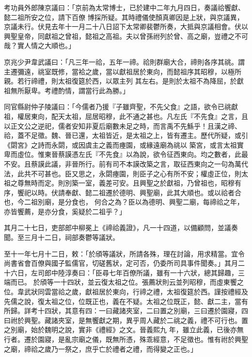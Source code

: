 \begin{pinyinscope}
 考功員外郎陳京議曰：「京前為太常博士，已於建中二年九月四日，奏議祫饗獻、懿二祖所安之位，請下百僚
 博採所疑。其時禮儀使顏真卿因是上狀，與京議異，京議未行。伏見去年十一月二十八日詔下太常卿裴鬱所奏，大抵與京議相會。伏以興聖皇帝，同獻祖之曾祖，懿祖之高祖。夫以曾孫祔列於曾、高之廟，豈禮之不可哉？實人情之大順也。」



 京兆少尹韋武議曰：「凡三年一祫，五年一禘。祫則群廟大合，禘則各序其祧。謂主遷彌遠，祧室既修，當袷之歲，當以獻祖居於東向，而懿祖序其昭穆，以極所親。若行禘禮，則太祖復筵於西，以眾主列
 其左右。是則於太祖不為降屈，於獻祖無所厭卑。考禮酌情，謂當行此為勝。」



 同官縣尉仲子陵議曰：「今儒者乃援『子雖齊聖，不先父食』之語，欲令已祧獻祖，權居東向，配天太祖，屈居昭穆，此不通之甚也。凡左氏『不先食』之言，且以正文公之逆祀，儒者安知非夏后廟數未足之時，而言禹不先鯀乎！且漢之禘、祫，蓋不足徵。魏、晉已還，太祖皆近，是太祖之上，皆有遷主。歷代所疑，或引《閟宮》之詩而永閟，或因虞主之義而瘞園，或緣遠廟為祧以
 築宮，或言太祖實卑而虛位。惟東晉蔡謨憑左氏『不先食』以為說，欲令征西東向。均之數者，此最不安。且蔡謨此議，非晉所行。前有司不本謨改築之言，取征西東向之一句為萬代法，此共不可甚也。臣又思之，永閟瘞園，則臣子之心有所不安；權虛正位，則太祖之尊無時而定。則別築一室，義差可安。且興聖之於獻祖，乃曾祖也，昭穆有序，饗祀以時。伏請奉獻、懿二祖遷於德明、興聖廟，此其大順也。或以祫者合也，今二祖別廟，是分食也，
 何合之為？臣以為德明、興聖二廟，每禘祫之年，亦皆饗薦，是亦分食，奚疑於二祖乎？」



 其月二十七日，吏部郎中柳冕上《禘祫義證》，凡一十四道，以備顧問，並議奏聞。至三月十二日，祠部奏鬱等議狀。



 至十一年七月十二日，敕：「於頎等議狀，所請各殊，理在討論，用求精當。宜令尚書省會百僚與國子監儒官，切磋舊狀，定可否，仍委所司具事件聞奏。」其月二十六日，左司郎中陸淳奏曰：「臣尋七年百僚所議，雖有一十六狀，總其歸趣，三端而已。
 於頎等一十四狀，並云復太祖之位。張薦狀則云並列昭穆，而虛東饗之位。韋武狀同雲當祫之歲，獻祖居於東向，行禘之禮，太祖復筵於西。謹按禮經及先儒之說，復太祖之位，位既正也，義在不疑。太祖之位既正，懿、獻二主，當有所歸。詳考十四狀，其意有四：一曰藏諸夾室，二曰置之別廟，三曰遷於園寢，四曰祔於興聖。藏諸夾室，是無饗獻之期，異乎周人藏於二祧之義，禮不可行也。置之別廟，始於魏明之說，實非《禮經》之文。晉義熙九
 年，雖立此義，已後亦無行者。遷於園寢，是亂宗廟之儀，既無所憑，殊乖經意，不足徵也。惟有祔於興聖之廟，禘祫之歲乃一祭之，庶乎亡於禮者之禮，而得變之正也。」




\end{pinyinscope}
